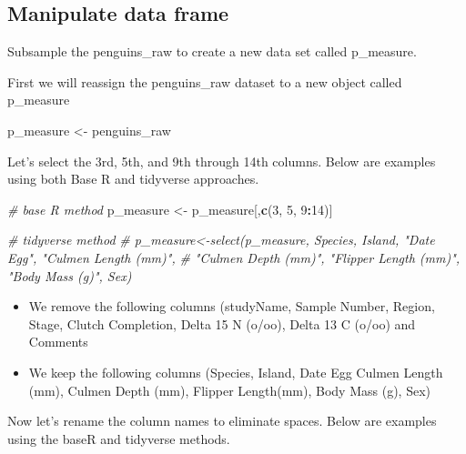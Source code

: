 \documentclass[
]{book}
\newenvironment{Shaded}{\begin{snugshade}}{\end{snugshade}}
\newcommand{\CommentTok}[1]{\textcolor[rgb]{0.56,0.35,0.01}{\textit{#1}}}
\newcommand{\DecValTok}[1]{\textcolor[rgb]{0.00,0.00,0.81}{#1}}
\newcommand{\FunctionTok}[1]{\textcolor[rgb]{0.13,0.29,0.53}{\textbf{#1}}}
\newcommand{\NormalTok}[1]{#1}
\newcommand{\OtherTok}[1]{\textcolor[rgb]{0.56,0.35,0.01}{#1}}
\newcommand{\SpecialCharTok}[1]{\textcolor[rgb]{0.81,0.36,0.00}{\textbf{#1}}}
\providecommand{\tightlist}{%
  \setlength{\itemsep}{0pt}\setlength{\parskip}{0pt}}
\begin{document}
\subsection{Manipulate data frame}\label{manipulate-data-frame}

Subsample the penguins\_raw to create a new data set called p\_measure.

First we will reassign the penguins\_raw dataset to a new object called p\_measure

\begin{Shaded}
\begin{Highlighting}[]
\NormalTok{p\_measure }\OtherTok{\textless{}{-}}\NormalTok{ penguins\_raw}
\end{Highlighting}
\end{Shaded}

Let's select the 3rd, 5th, and 9th through 14th columns. Below are examples using both Base R and tidyverse approaches.

\begin{Shaded}
\begin{Highlighting}[]
\CommentTok{\# base R method}
\NormalTok{p\_measure }\OtherTok{\textless{}{-}}\NormalTok{ p\_measure[,}\FunctionTok{c}\NormalTok{(}\DecValTok{3}\NormalTok{, }\DecValTok{5}\NormalTok{, }\DecValTok{9}\SpecialCharTok{:}\DecValTok{14}\NormalTok{)]}

\CommentTok{\# tidyverse method}
\CommentTok{\# p\_measure\textless{}{-}select(p\_measure, Species, Island, "Date Egg", "Culmen Length (mm)",}
\CommentTok{\#                   "Culmen Depth (mm)", "Flipper Length (mm)", "Body Mass (g)", Sex)}
\end{Highlighting}
\end{Shaded}

\begin{itemize}
\tightlist
\item
  We remove the following columns (studyName, Sample Number, Region, Stage, Clutch Completion, Delta 15 N (o/oo), Delta 13 C (o/oo) and Comments
\item
  We keep the following columns (Species, Island, Date Egg Culmen Length (mm), Culmen Depth (mm), Flipper Length(mm), Body Mass (g), Sex)
\end{itemize}

Now let's rename the column names to eliminate spaces. Below are examples using the baseR and tidyverse methods.
\end{document}
